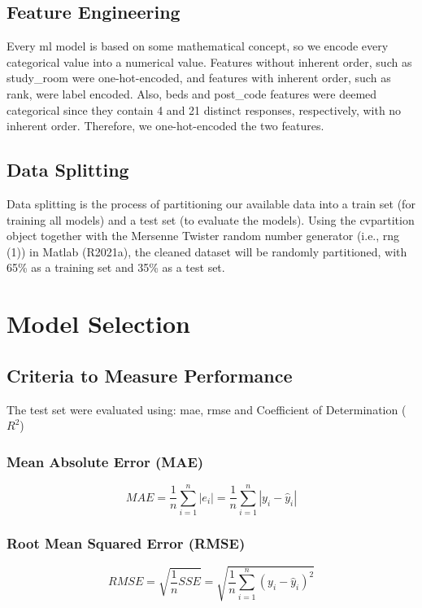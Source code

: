 \begin{sloppypar}
	\subsection{Feature Engineering}
	Every \ac{ml} model is based on some mathematical concept, so we encode every categorical value into a numerical value. Features without inherent order, such as study\_room were one-hot-encoded, and features with inherent order, such as rank, were label encoded.
	Also, beds and post\_code features were deemed categorical since they contain 4 and 21 distinct responses, respectively, with no inherent order. Therefore, we one-hot-encoded the two features.
	
	\subsection{Data Splitting}
	Data splitting is the process of partitioning our available data into a train set (for training all models) and a test set (to evaluate the models). Using the cvpartition object together with the Mersenne Twister random number generator (i.e., rng (1)) in Matlab (R2021a), the cleaned dataset will be randomly partitioned, with 65\% as a training set and 35\% as a test set.
	
	
	\section{Model Selection}
	\subsection{Criteria to Measure Performance}
	The test set were evaluated using: \ac{mae}, \ac{rmse} and Coefficient of Determination ($ R^2 $)
	
	\subsubsection{Mean Absolute Error (MAE)}
	\begin{equation} \label{eqn:mae}
	MAE = \frac{1}{n}\sum_{i=1}^{n} |e_i| = \frac{1}{n}\sum_{i=1}^{n} |y_i - \hat{y}_i|
	\end{equation}
		
	\subsubsection{Root Mean Squared Error (RMSE)}
	\begin{equation} \label{eqn:rmse}
		RMSE = \sqrt{ \frac{1}{n} SSE } = \sqrt{ \frac{1}{n} \sum_{i=1}^{n} (y_i - \hat{y}_i)^2 } 
	\end{equation}
	

\end{sloppypar}
